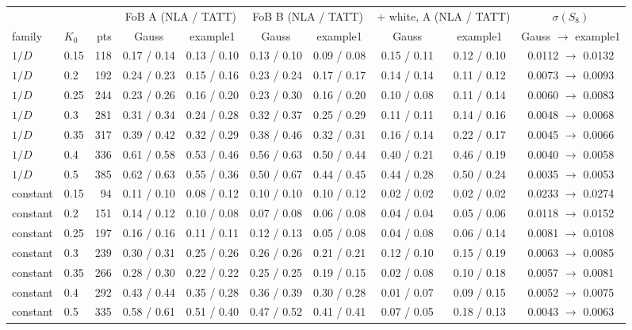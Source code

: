 \begin{tabular}{llr cc cc cc c}\toprule
 & & & \multicolumn{2}{c}{FoB A (NLA / TATT)} & \multicolumn{2}{c}{FoB B (NLA / TATT)} & \multicolumn{2}{c}{+ white, A (NLA / TATT)} & $\sigma(S_8)$\\ \cmidrule(lr){4-5}\cmidrule(lr){6-7}\cmidrule(lr){8-9}
family & $K_0$ & pts & Gauss & example1 & Gauss & example1 & Gauss & example1 & Gauss $\to$ example1\\ \midrule
$1/D$ & 0.15 & 118 & 0.17 / 0.14 & 0.13 / 0.10 & 0.13 / 0.10 & 0.09 / 0.08 & 0.15 / 0.11 & 0.12 / 0.10 & 0.0112 $\to$ 0.0132\\
$1/D$ & 0.2 & 192 & 0.24 / 0.23 & 0.15 / 0.16 & 0.23 / 0.24 & 0.17 / 0.17 & 0.14 / 0.14 & 0.11 / 0.12 & 0.0073 $\to$ 0.0093\\
$1/D$ & 0.25 & 244 & 0.23 / 0.26 & 0.16 / 0.20 & 0.23 / 0.30 & 0.16 / 0.20 & 0.10 / 0.08 & 0.11 / 0.14 & 0.0060 $\to$ 0.0083\\
$1/D$ & 0.3 & 281 & 0.31 / 0.34 & 0.24 / 0.28 & 0.32 / 0.37 & 0.25 / 0.29 & 0.11 / 0.11 & 0.14 / 0.16 & 0.0048 $\to$ 0.0068\\
$1/D$ & 0.35 & 317 & 0.39 / 0.42 & 0.32 / 0.29 & 0.38 / 0.46 & 0.32 / 0.31 & 0.16 / 0.14 & 0.22 / 0.17 & 0.0045 $\to$ 0.0066\\
$1/D$ & 0.4 & 336 & 0.61 / 0.58 & 0.53 / 0.46 & 0.56 / 0.63 & 0.50 / 0.44 & 0.40 / 0.21 & 0.46 / 0.19 & 0.0040 $\to$ 0.0058\\
$1/D$ & 0.5 & 385 & 0.62 / 0.63 & 0.55 / 0.36 & 0.50 / 0.67 & 0.44 / 0.45 & 0.44 / 0.28 & 0.50 / 0.24 & 0.0035 $\to$ 0.0053\\
\midrule
constant & 0.15 & 94 & 0.11 / 0.10 & 0.08 / 0.12 & 0.10 / 0.10 & 0.10 / 0.12 & 0.02 / 0.02 & 0.02 / 0.02 & 0.0233 $\to$ 0.0274\\
constant & 0.2 & 151 & 0.14 / 0.12 & 0.10 / 0.08 & 0.07 / 0.08 & 0.06 / 0.08 & 0.04 / 0.04 & 0.05 / 0.06 & 0.0118 $\to$ 0.0152\\
constant & 0.25 & 197 & 0.16 / 0.16 & 0.11 / 0.11 & 0.12 / 0.13 & 0.05 / 0.08 & 0.04 / 0.08 & 0.06 / 0.14 & 0.0081 $\to$ 0.0108\\
constant & 0.3 & 239 & 0.30 / 0.31 & 0.25 / 0.26 & 0.26 / 0.26 & 0.21 / 0.21 & 0.12 / 0.10 & 0.15 / 0.19 & 0.0063 $\to$ 0.0085\\
constant & 0.35 & 266 & 0.28 / 0.30 & 0.22 / 0.22 & 0.25 / 0.25 & 0.19 / 0.15 & 0.02 / 0.08 & 0.10 / 0.18 & 0.0057 $\to$ 0.0081\\
constant & 0.4 & 292 & 0.43 / 0.44 & 0.35 / 0.28 & 0.36 / 0.39 & 0.30 / 0.28 & 0.01 / 0.07 & 0.09 / 0.15 & 0.0052 $\to$ 0.0075\\
constant & 0.5 & 335 & 0.58 / 0.61 & 0.51 / 0.40 & 0.47 / 0.52 & 0.41 / 0.41 & 0.07 / 0.05 & 0.18 / 0.13 & 0.0043 $\to$ 0.0063\\
\bottomrule\end{tabular}